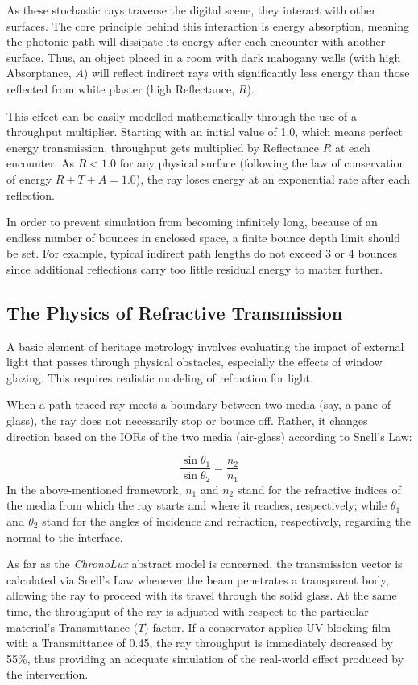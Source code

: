 As these stochastic rays traverse the digital scene, they interact with other surfaces. The core principle behind this interaction is energy absorption, meaning the photonic path will dissipate its energy after each encounter with another surface. Thus, an object placed in a room with dark mahogany walls (with high Absorptance, $A$) will reflect indirect rays with significantly less energy than those reflected from white plaster (high Reflectance, $R$).

This effect can be easily modelled mathematically through the use of a throughput multiplier. Starting with an initial value of 1.0, which means perfect energy transmission, throughput gets multiplied by Reflectance $R$ at each encounter. As $R < 1.0$ for any physical surface (following the law of conservation of energy $R + T + A = 1.0$), the ray loses energy at an exponential rate after each reflection.

In order to prevent simulation from becoming infinitely long, because of an endless number of bounces in enclosed space, a finite bounce depth limit should be set. For example, typical indirect path lengths do not exceed 3 or 4 bounces since additional reflections carry too little residual energy to matter further.

\subsection{The Physics of Refractive Transmission}
A basic element of heritage metrology involves evaluating the impact of external light that passes through physical obstacles, especially the effects of window glazing. This requires realistic modeling of refraction for light.

When a path traced ray meets a boundary between two media (say, a pane of glass), the ray does not necessarily stop or bounce off. Rather, it changes direction based on the IORs of the two media (air-glass) according to Snell's Law:

\begin{equation}
    \frac{\sin \theta_1}{\sin \theta_2} = \frac{n_2}{n_1}
\end{equation}
In the above-mentioned framework, $n_1$ and $n_2$ stand for the refractive indices of the media from which the ray starts and where it reaches, respectively; while $\theta_1$ and $\theta_2$ stand for the angles of incidence and refraction, respectively, regarding the normal to the interface.

As far as the \textit{ChronoLux} abstract model is concerned, the transmission vector is calculated via Snell's Law whenever the beam penetrates a transparent body, allowing the ray to proceed with its travel through the solid glass. At the same time, the throughput of the ray is adjusted with respect to the particular material's Transmittance ($T$) factor. If a conservator applies UV-blocking film with a Transmittance of 0.45, the ray throughput is immediately decreased by 55\%, thus providing an adequate simulation of the real-world effect produced by the intervention.

